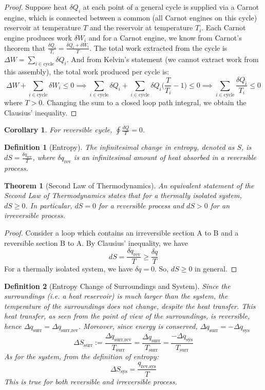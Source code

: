 \documentclass[a4paper]{article}
\theoremstyle{new}
\newtheorem{defi}{Definition}[section]
\newtheorem{thm}{Theorem}[section]
\newtheorem{cor}{Corollary}[section]
\begin{document}
\begin{proof}
Suppose heat $\delta Q_i$ at each point of a general cycle is supplied via a Carnot engine, which is connected between a common (all Carnot engines on this cycle) reservoir at temperature $T$ and the reservoir at temperature $T_i$. Each Carnot engine produces work $\delta W_i$ and for a Carnot engine, we know from Carnot's theorem that $\frac{\delta Q_i}{T_i}=\frac{\delta Q_i+\delta W_i}{T}$. The total work extracted from the cycle is $\Delta W=\sum_{i\in\text{cycle}}\delta Q_i$. And from Kelvin's statement (we cannot extract work from this assembly), the total work produced per cycle is:
$$\Delta W+\sum_{i\in\text{cycle}}\delta W_i\leq 0\implies\sum_{i\in\text{cycle}}\delta Q_i+\sum_{i\in\text{cycle}}\delta Q_i\bigg(\frac{T}{T_i}-1\bigg)\leq0\implies \sum_{i\in\text{cycle}}\frac{\delta Q_i}{T_i}\leq 0$$
where $T>0$. Changing the sum to a closed loop path integral, we obtain the Clausius' inequality.
\end{proof}
\begin{cor}
For reversible cycle, $\oint\frac{dQ}{T}=0$.
\end{cor}
\begin{defi}[Entropy]
The infinitesimal change in entropy, denoted as $S$, is $dS=\frac{\delta q_{\text{rev}}}{T}\label{entropy}$, where $\delta q_{\text{rev}}$ is an infinitesimal amount of heat absorbed in a reversible process. 
\end{defi}
\begin{thm}[Second Law of Thermodynamics]
An equivalent statement of the Second Law of Thermodynamics states that for a thermally isolated system, $dS\geq0$. In particular, $dS=0$ for a reversible process and $dS>0$ for an irreversible process.
\end{thm}
\begin{proof}
Consider a loop which contains an irreversible section A to B and a reversible section B to A. By Clausius' inequality, we have
$$dS=\frac{\delta q_{\text{rev}}}{T}\geq\frac{\delta q}{T}$$
For a thermally isolated system, we have $\delta q=0$. So, $dS\geq0$ in general.
\end{proof}
\begin{defi}[Entropy Change of Surroundings and System]
Since the surroundings (i.e. a heat reservoir) is much larger than the system, the temperature of the surroundings does not change, despite the heat transfer. This heat transfer, as seen from the point of view of the surroundings, is reversible, hence $\Delta q_{\text{surr}}=\Delta q_{\text{surr,rev}}$. Moreover, since energy is conserved, $\Delta q_{\text{surr}}=-\Delta q_{\text{sys}}$
$$\Delta S_{\text{surr}}:=\frac{\Delta q_{\text{surr,rev}}}{T_{\text{surr}}}=\frac{\Delta q_{\text{surr}}}{T_{\text{surr}}}=\frac{-\Delta q_{\text{sys}}}{T_{\text{surr}}}$$
As for the system, from the definition of entropy:
$$\Delta S_{\text{sys}}=\frac{q_{\text{rev,sys}}}{T}$$
This is true for both reversible and irreversible process.
\end{defi}
\end{document}
